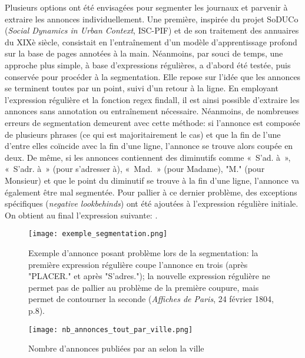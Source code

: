 Plusieurs options ont été envisagées pour segmenter les journaux et parvenir à extraire les annonces individuellement. Une première, inspirée du projet SoDUCo (\textit{Social Dynamics in Urban Context}, ISC-PIF) et de son traitement des annuaires du XIXè siècle, consistait en l'entraînement d'un modèle d'apprentissage profond sur la base de pages annotées à la main. Néanmoins, par souci de temps, une approche plus simple, à base d'expressions régulières, a d'abord été testée, puis conservée pour procéder à la segmentation. Elle repose sur l'idée que les annonces se terminent toutes par un point, suivi d'un retour à la ligne. En employant l'expression régulière   et la fonction regex findall, il est ainsi possible d'extraire les annonces sans annotation ou entraînement nécessaire. Néanmoins, de nombreuses erreurs de segmentation demeurent avec cette méthode: si l'annonce est composée de plusieurs phrases (ce qui est majoritairement le cas) et que la fin de l'une d'entre elles coïncide avec la fin d'une ligne, l'annonce se trouve alors coupée en deux. De même, si les annonces contiennent des diminutifs comme « S’ad. à », « S’adr. à » (pour s’adresser à), « Mad. » (pour Madame), "M." (pour Monsieur) et que le point du diminutif se trouve à la fin d’une ligne, l'annonce va également être mal segmentée. Pour pallier à ce dernier problème, des exceptions spécifiques (\textit{negative lookbehinds}) ont été ajoutées à l'expression régulière initiale. On obtient au final l'expression suivante: .

\bigskip

\begin{figure}[ht]
	\centering
	\texttt{[image: exemple\_segmentation.png]}
	\caption[Exemple d'annonce posant problème lors de la segmentation]{Exemple d'annonce posant problème lors de la segmentation: la première expression régulière coupe l'annonce en trois (après "PLACER." et après "S'adres."); la nouvelle expression régulière ne permet pas de pallier au problème de la première coupure, mais permet de contourner la seconde (\textit{Affiches de Paris}, 24 février 1804, p.8).}
\end{figure}

\begin{figure}[ht]
	\centering
	\texttt{[image: nb\_annonces\_tout\_par\_ville.png]}
	\caption{Nombre d'annonces publiées par an selon la ville}
\end{figure}



